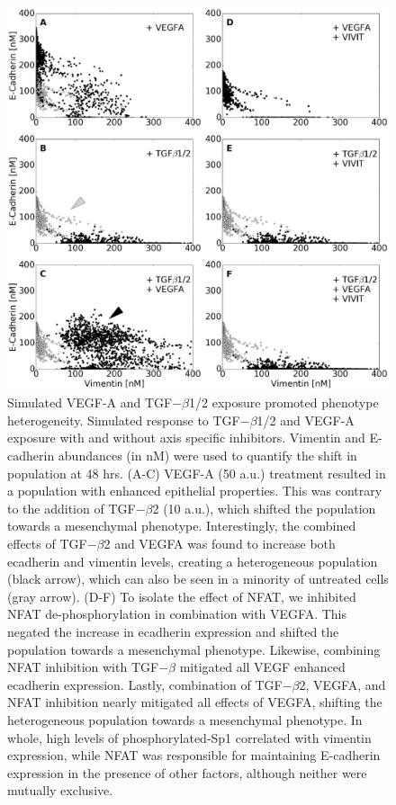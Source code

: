 \documentclass[11pt,letterpaper]{article}
\begin{document}
\begin{figure}
\includegraphics [width=1.0\linewidth] {./figs/Fig3_phenotype.pdf}
\caption{Simulated VEGF-A and TGF$-\beta$1/2 exposure promoted phenotype heterogeneity.
Simulated response to TGF$-\beta$1/2 and VEGF-A exposure with and without axis specific inhibitors.
Vimentin and E-cadherin abundances (in nM) were used to quantify the shift in population at 48 hrs.
(A-C) VEGF-A (50 a.u.) treatment resulted in a population with enhanced epithelial properties.
This was contrary to the addition of TGF$-\beta$2 (10 a.u.), which shifted the population towards a mesenchymal phenotype.
Interestingly, the combined effects of TGF$-\beta$2 and VEGFA was found to increase both ecadherin and vimentin levels, creating a heterogeneous population (black arrow), which can also be seen in a minority of untreated cells (gray arrow). (D-F) To isolate the effect of NFAT, we inhibited NFAT de-phosphorylation in combination with VEGFA. This negated the increase in ecadherin expression and shifted the population towards a mesenchymal phenotype.  Likewise, combining NFAT inhibition with TGF$-\beta$ mitigated all VEGF enhanced ecadherin expression.
Lastly, combination of TGF$-\beta$2, VEGFA, and NFAT inhibition nearly mitigated all effects of VEGFA, shifting the heterogeneous population towards a mesenchymal phenotype.
In whole, high levels of phosphorylated-Sp1 correlated with vimentin expression, while NFAT was responsible for maintaining E-cadherin expression in the presence of other factors, although neither were mutually exclusive.}
\label{fg:F3}
\end{figure}
\end{document}
